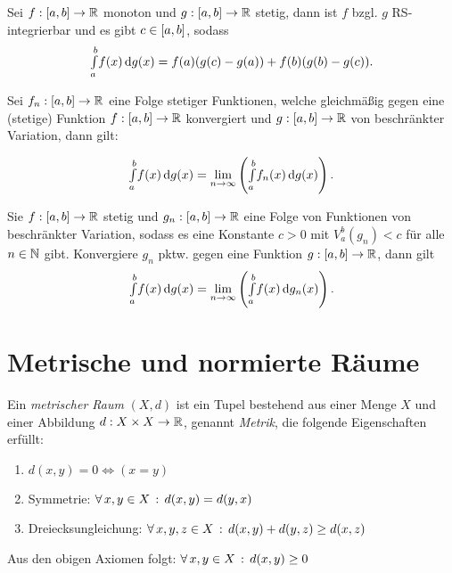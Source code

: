 \documentclass{cheat-sheet}
\begin{document}
\begin{satz}
Sei $f : \left[ a, b \right] \to \mathbb{R}$ monoton und $g : \left[ a, b \right] \to \mathbb{R}$ stetig, dann ist $f$ bzgl. $g$ RS-integrierbar und es gibt $c \in \left[ a, b \right]$, sodass
\[ {\textstyle \int\limits_{a}^{b}} f(x) \,\mathrm{d} g(x) = f(a)(g(c) - g(a)) + f(b)(g(b) - g(c)). \]
\end{satz}

\begin{satz}
Sei $f_n : \left[ a, b \right] \to \mathbb{R}$ eine Folge stetiger Funktionen, welche gleichmäßig gegen eine (stetige) Funktion $f : \left[ a, b \right] \to \mathbb{R}$ konvergiert und $g : \left[ a, b \right] \to \mathbb{R}$ von beschränkter Variation, dann gilt:

\[ {\textstyle \int\limits_{a}^{b}} f(x) \,\mathrm{d} g(x) = \lim_{n \to \infty} \left({\textstyle \int\limits_{a}^{b}} f_n(x) \,\mathrm{d} g(x)\right). \]
\end{satz}

\begin{satz}
Sie $f : \left[ a, b \right] \to \mathbb{R}$ stetig und $g_n : \left[ a, b \right] \to \mathbb{R}$ eine Folge von Funktionen von beschränkter Variation, sodass es eine Konstante $c > 0$ mit $V_a^b(g_n) < c$ für alle $n \in \mathbb{N}$ gibt. Konvergiere $g_n$ pktw. gegen eine Funktion $g : \left[ a, b \right] \to \mathbb{R}$, dann gilt
\[ {\textstyle \int\limits_{a}^{b}} f(x) \,\mathrm{d} g(x) = \lim_{n \to \infty} \left({\textstyle \int\limits_{a}^{b}} f(x) \,\mathrm{d} g_n(x)\right). \]
\end{satz}


\section{Metrische und normierte Räume}

\begin{defn}
Ein \emph{metrischer Raum} $(X, d)$ ist ein Tupel bestehend aus einer Menge $X$ und einer Abbildung $d : X \times X \to \mathbb{R}$, genannt \emph{Metrik}, die folgende Eigenschaften erfüllt:

\begin{enumerate}
  \item $d(x, y) = 0 \iff (x = y)$
  \item Symmetrie: $\forall \, {x, y \in X} \,:\, d(x, y) = d(y, x)$
  \item Dreiecksungleichung: $\forall \, {x, y, z \in X} \,:\, d(x, y) + d(y, z) \ge d(x, z)$
\end{enumerate}
\end{defn}

\begin{bem}
Aus den obigen Axiomen folgt: $\forall \, {x, y \in X} \,:\, d(x, y) \ge 0$
\end{bem}
\end{document}
